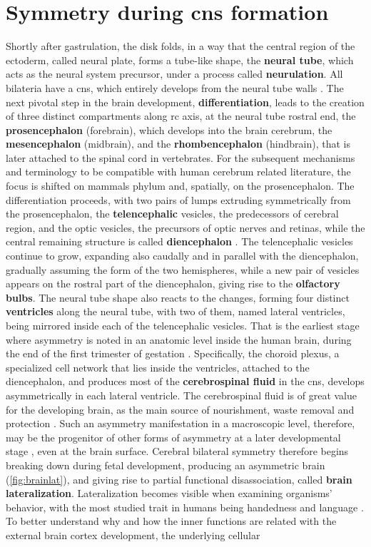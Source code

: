 \section{Symmetry during \acs{cns} formation}
Shortly after gastrulation, the disk folds, in a way that the central region of the ectoderm, called neural plate, forms a tube-like shape, the \textbf{neural tube}, which acts as the neural system precursor, under a process called \textbf{neurulation}. All bilateria have a \acf{cns}, which entirely develops from the neural tube walls \cite{F.Bear2016a}. The next pivotal step in the brain development, \textbf{differentiation}, leads to the creation of three distinct compartments along \acf{rc} axis, at the neural tube rostral end, the \textbf{prosencephalon} (forebrain), which develops into the brain cerebrum, the \textbf{mesencephalon} (midbrain), and the \textbf{rhombencephalon} (hindbrain), that is later attached to the spinal cord in vertebrates. For the subsequent mechanisms and terminology to be compatible with human cerebrum related literature, the focus is shifted on mammals phylum and, spatially, on the prosencephalon. The differentiation proceeds, with two pairs of lumps extruding symmetrically from the prosencephalon, the \textbf{telencephalic} vesicles, the predecessors of cerebral region, and the optic vesicles, the precursors of optic nerves and retinas, while the central remaining structure is called \textbf{diencephalon} \cite{F.Bear2016b}. The telencephalic vesicles continue to grow, expanding also caudally and in parallel with the diencephalon, gradually assuming the form of the two hemispheres, while a new pair of vesicles appears on the rostral part of the diencephalon, giving rise to the \textbf{olfactory bulbs}. The neural tube shape also reacts to the changes, forming four distinct \textbf{ventricles} along the neural tube, with two of them, named lateral ventricles, being mirrored inside each of the telencephalic vesicles. That is the earliest stage where asymmetry is noted in an anatomic level inside the human brain, during the end of the first trimester of gestation \cite{Abu-Rustum2013}. Specifically, the choroid plexus, a specialized cell network that lies inside the ventricles, attached to the diencephalon, and produces most of the \textbf{cerebrospinal fluid} in the \ac{cns},  develops asymmetrically in each lateral ventricle. The cerebrospinal fluid is of great value for the developing brain, as the main source of nourishment, waste removal and protection \cite{Telano2021}. Such an asymmetry manifestation in a macroscopic level, therefore, may be the progenitor of other forms of asymmetry at a later developmental stage \cite{Schmitz2019}, even at the brain surface. Cerebral bilateral symmetry therefore begins breaking down during fetal development, producing an asymmetric brain (\autoref{fig:brainlat}), and giving rise to partial functional disassociation, called \textbf{brain lateralization}. Lateralization becomes visible when examining organisms' behavior, with the most studied trait in humans being handedness and language \cite{Schmitz2019,Corballis2009}. To better understand why and how the inner functions are related with the external brain cortex development, the underlying cellular 